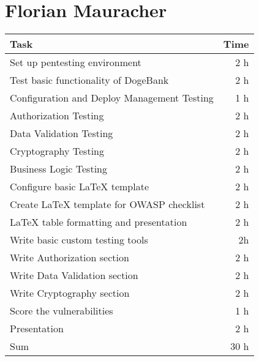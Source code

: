 \section*{Florian Mauracher}
\begin{table}[h!tpb]
  \centering
  \begin{tabularx}{\textwidth}{X r}
    \toprule
      Task & Time \\
    \midrule
      Set up pentesting environment & 2 h \\
      Test basic functionality of DogeBank & 2 h \\
      Configuration and Deploy Management Testing & 1 h \\
      Authorization Testing & 2 h \\
      Data Validation Testing & 2 h \\
      Cryptography Testing & 2 h \\
      Business Logic Testing & 2 h \\
      Configure basic \LaTeX{} template & 2 h \\
      Create \LaTeX{} template for OWASP checklist & 2 h \\
      \LaTeX{} table formatting and presentation & 2 h \\
      Write basic custom testing tools & 2h \\
      Write Authorization section & 2 h \\
      Write Data Validation section & 2 h \\
      Write Cryptography section & 2 h \\
      Score the vulnerabilities & 1 h \\
      Presentation & 2 h \\
    \midrule
      Sum & 30 h \\
    \bottomrule
  \end{tabularx}
\end{table}

\clearpage
